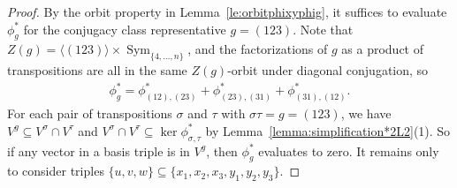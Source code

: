 \documentclass[pdftex]{sigma}
\numberwithin{equation}{section}
\DeclareMathOperator{\Sym}{Sym}
\begin{document}
\begin{proof}
By the orbit property in Lemma~\ref{le:orbitphixyphig}, it suffices to evaluate $\phi^*_g$ for the conjugacy
class representative $g=(123)$. Note that $Z(g)=\langle(123)\rangle\times \Sym_{\{4,\dots,n\}}$,
and the factorizations of $g$ as a product of transpositions are all in the same $Z(g)$-orbit
under diagonal conjugation, so
\begin{gather*}
\phi_g^{*}=\phi_{(12),(23)}^{*}+\phi_{(23),(31)}^{*}+\phi_{(31),(12)}^{*}.
\end{gather*}
For each pair of transpositions $\sigma$ and $\tau$ with $\sigma\tau=g=(123)$,
we have $V^g \subseteq V^\sigma \cap V^\tau$ and
$V^\sigma \cap V^\tau \subseteq \ker \phi^*_{\sigma,\tau}$
by Lemma~\ref{lemma:simplification*2L2}(1). So if any vector in a basis triple is in $V^g$, then $\phi^*_g$
evaluates to zero. It remains only to consider triples
$\{u,v,w\} \subseteq \{x_1,x_2,x_3,y_1,y_2,y_3\}$.


\end{proof}
\end{document}
